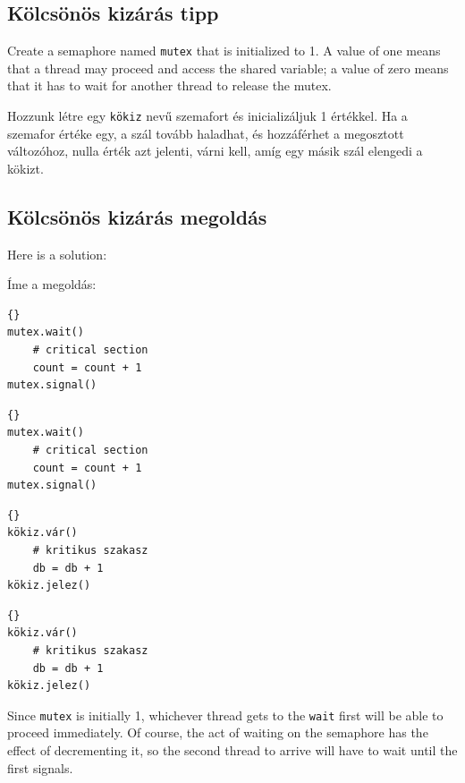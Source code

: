 \documentclass{book}
\newcommand{\clearemptydoublepage}{\newpage\cleardoublepage}
\begin{document}
\clearemptydoublepage
\subsection{Kölcsönös kizárás tipp}

Create a semaphore named {\tt mutex} that is initialized
to 1.  A value of one means that a thread may proceed and
access the shared variable; a value of zero means that it
has to wait for another thread to release the mutex.

Hozzunk létre egy {\tt kökiz} nevű szemafort és inicializáljuk
1 értékkel. Ha a szemafor értéke egy, a szál tovább haladhat,
és hozzáférhet a megosztott változóhoz, nulla érték azt jelenti,
várni kell, amíg egy másik szál elengedi a kökizt.

\clearemptydoublepage
\subsection{Kölcsönös kizárás megoldás}

Here is a solution:

Íme a megoldás:

\begin{minipage}[t]{2in}
\begin{lstlisting}[title={Thread A}]{}
mutex.wait()
    # critical section
    count = count + 1
mutex.signal()
\end{lstlisting}
\end{minipage}
\hfill
\begin{minipage}[t]{2in}
\begin{lstlisting}[title={Thread B}]{}
mutex.wait()
    # critical section
    count = count + 1
mutex.signal()
\end{lstlisting}
\end{minipage}

\begin{minipage}[t]{2in}
\begin{lstlisting}[title={„A” szál}]{}
kökiz.vár()
    # kritikus szakasz
    db = db + 1
kökiz.jelez()
\end{lstlisting}
\end{minipage}
\hfill
\begin{minipage}[t]{2in}
\begin{lstlisting}[title={„B” szál}]{}
kökiz.vár()
    # kritikus szakasz
    db = db + 1
kökiz.jelez()
\end{lstlisting}
\end{minipage}

Since {\tt mutex} is initially 1, whichever thread gets to
the {\tt wait} first will be able to proceed immediately.
Of course, the act of waiting on the semaphore has the effect
of decrementing it, so the second thread to
arrive will have to wait until the first signals.
\end{document}
